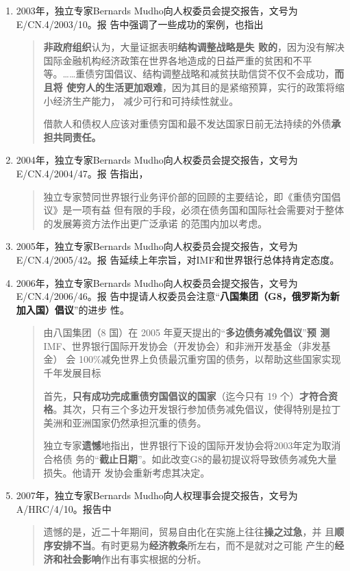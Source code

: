 \begin{enumerate}
\item 2003年，独立专家Bernards Mudho向人权委员会提交报告，文号为E/CN.4/2003/10。报
  告中强调了一些成功的案例，也指出
  \begin{quotation} \textbf{非政府组织}认为，大量证据表明\textbf{结构调整战略是失
      败的}，因为没有解决国际金融机构经济政策在世界各地造成的日益严重的贫困和不平
    等。……重债穷国倡议、结构调整战略和减贫扶助信贷不仅不会成功，\textbf{而且将
      使穷人的生活更加艰难}，因为其目的是紧缩预算，实行的政策将缩小经济生产能力，
    减少可行和可持续性就业。

    借款人和债权人应该对重债穷国和最不发达国家日前无法持续的外债\textbf{承担共同责任。}
  \end{quotation}

\item 2004年，独立专家Bernards Mudho向人权委员会提交报告，文号为E/CN.4/2004/47。报
  告指出，
  \begin{quotation}
    独立专家赞同世界银行业务评价部的回顾的主要结论，即《重债穷国倡议》是一项有益
    但有限的手段，必须在债务国和国际社会需要对于整体的发展筹资方法作出更广泛承诺
    的范围内加以考虑。
  \end{quotation}

\item 2005年，独立专家Bernards Mudho向人权委员会提交报告，文号为E/CN.4/2005/42。报
  告延续上年宗旨，对IMF和世界银行总体持肯定态度。

\item 2006年，独立专家Bernards Mudho向人权委员会提交报告，文号为E/CN.4/2006/46。报
  告中提请人权委员会注意“\textbf{八国集团（G8，俄罗斯为新加入国）倡议}”的进步
  性。
  \begin{quotation}
    由八国集团（8 国）在 2005 年夏天提出的“\textbf{多边债务减免倡议}”\textbf{预
      测}IMF、世界银行国际开发协会（开发协会）和非洲开发基金（非发基金）
    会 100\%减免世界上负债最沉重穷国的债务，以帮助这些国家实现千年发展目标

    首先，\textbf{只有成功完成重债穷国倡议的国家}（迄今只有 19 个）\textbf{才符合资格}。其次，只有三个多边开发银行参加债务减免倡议，使得特别是拉丁美洲和亚洲国家仍然承担沉重的债务。

    独立专家\textbf{遗憾}地指出，世界银行下设的国际开发协会将2003年定为取消合格债
    务的“\textbf{截止日期}”。如此改变G8的最初提议将导致债务减免大量损失。他请开
    发协会重新考虑其决定。
  \end{quotation}

\item 2007年，独立专家Bernards Mudho向人权理事会提交报告，文号为A/HRC/4/10。报告中
  \begin{quotation}
    遗憾的是，近二十年期间，贸易自由化在实施上往往\textbf{操之过急}，并
    且\textbf{顺序安排不当}。有时更易为\textbf{经济教条}所左右，而不是就对之可能
    产生的\textbf{经济和社会影响}作出有事实根据的分析。
  \end{quotation}


\end{enumerate}
